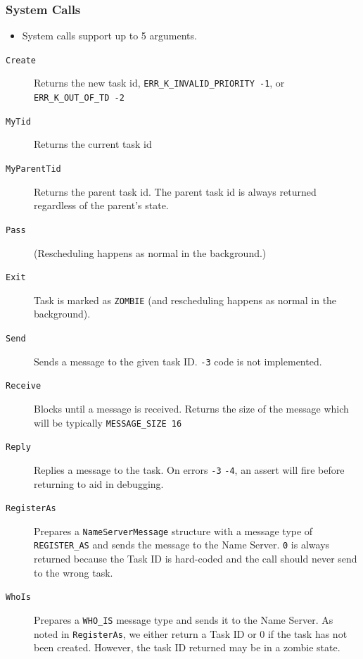 \documentclass[letterpaper]{article}
\begin{document}
\subsubsection{System Calls%
  \label{system-calls}%
}
%
\begin{itemize}

\item System calls support up to 5 arguments.

\end{itemize}
%
\begin{description}
\item[{\texttt{Create}}] \leavevmode 
Returns the new task id, \texttt{ERR\_K\_INVALID\_PRIORITY -1}, or \texttt{ERR\_K\_OUT\_OF\_TD -2}

\item[{\texttt{MyTid}}] \leavevmode 
Returns the current task id

\item[{\texttt{MyParentTid}}] \leavevmode 
Returns the parent task id. The parent task id is always returned regardless of the parent's state.

\item[{\texttt{Pass}}] \leavevmode 
(Rescheduling happens as normal in the background.)

\item[{\texttt{Exit}}] \leavevmode 
Task is marked as \texttt{ZOMBIE} (and rescheduling happens as normal in the background).

\item[{\texttt{Send}}] \leavevmode 
Sends a message to the given task ID. \texttt{-3} code is not implemented.

\item[{\texttt{Receive}}] \leavevmode 
Blocks until a message is received. Returns the size of the message which will be typically \texttt{MESSAGE\_SIZE 16}

\item[{\texttt{Reply}}] \leavevmode 
Replies a message to the task. On errors \texttt{-3} \texttt{-4}, an assert will fire before returning to aid in debugging.

\item[{\texttt{RegisterAs}}] \leavevmode 
Prepares a \texttt{NameServerMessage} structure with a message type of \texttt{REGISTER\_AS} and sends the message to the Name Server. \texttt{0} is always returned because the Task ID is hard-coded and the call should never send to the wrong task.

\item[{\texttt{WhoIs}}] \leavevmode 
Prepares a \texttt{WHO\_IS} message type and sends it to the Name Server. As noted in \texttt{RegisterAs}, we either return a Task ID or 0 if the task has not been created. However, the task ID returned may be in a zombie state.


\end{description}
\end{document}
